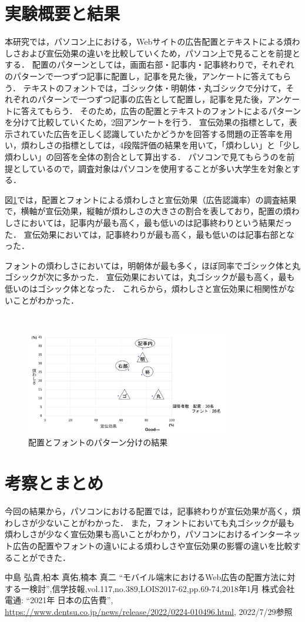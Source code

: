 \documentclass[twocolumn,10pt,a4j]{ltjsarticle}
\begin{document}
\section{実験概要と結果}
本研究では，パソコン上における，Webサイトの広告配置とテキストによる煩わしさおよび宣伝効果の違いを比較していくため，パソコン上で見ることを前提とする．
配置のパターンとしては，画面右部・記事内・記事終わりで，それぞれのパターンで一つずつ記事に配置し，記事を見た後，アンケートに答えてもらう．
テキストのフォントでは，ゴシック体・明朝体・丸ゴシックで分けて，それぞれのパターンで一つずつ記事の広告として配置し，記事を見た後，アンケートに答えてもらう．
そのため，広告の配置とテキストのフォントによるパターンを分けて比較していくため，2回アンケートを行う．
宣伝効果の指標として，表示されていた広告を正しく認識していたかどうかを回答する問題の正答率を用い，煩わしさの指標としては，4段階評価の結果を用いて，「煩わしい」と「少し煩わしい」の回答を全体の割合として算出する．
パソコンで見てもらうのを前提としているので，調査対象はパソコンを使用することが多い大学生を対象とする．

図\ref{fig:結果}では，配置とフォントによる煩わしさと宣伝効果（広告認識率）の調査結果で，横軸が宣伝効果，縦軸が煩わしさの大きさの割合を表しており，配置の煩わしさにおいては，記事内が最も高く，最も低いのは記事終わりという結果だった．
宣伝効果においては，記事終わりが最も高く，最も低いのは記事右部となった．

フォントの煩わしさにおいては，明朝体が最も多く，ほぼ同率でゴシック体と丸ゴシックが次に多かった．
宣伝効果においては，丸ゴシックが最も高く，最も低いのはゴシック体となった．
これらから，煩わしさと宣伝効果に相関性がないことがわかった．

　
\begin{figure}[h]
\begin{center}
 \includegraphics[height=45mm]{結果.png}
\end{center}
 \caption{配置とフォントのパターン分けの結果}
 \label{fig:結果}
\end{figure}

\section{考察とまとめ}
今回の結果から，パソコンにおける配置では，記事終わりが宣伝効果が高く，煩わしさが少ないことがわかった．
また，フォントにおいても丸ゴシックが最も煩わしさが少なく宣伝効果も高いことがわかり，パソコンにおけるインターネット広告の配置やフォントの違いによる煩わしさや宣伝効果の影響の違いを比較することができた．

\begin{thebibliography}{99}
 中島 弘貴,柗本 真佑,楠本 真二 ``モバイル端末におけるWeb広告の配置方法に対する一検討'',信学技報,vol.117,no.389,LOIS2017-62,pp.69-74,2018年1月
 株式会社電通: ``2021年 日本の広告費'', \url{https://www.dentsu.co.jp/news/release/2022/0224-010496.html}, 2022/7/29参照
\end{thebibliography}
\end{document}
